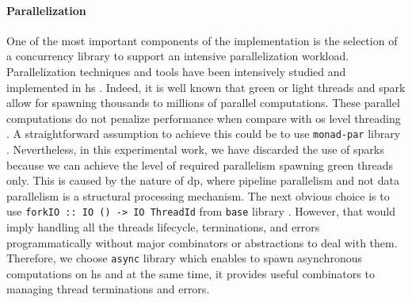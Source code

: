 \documentclass[preprint]{elsarticle}
\begin{document}
\paragraph{Parallelization} One of the most important components of the implementation is the selection of a concurrency library to support an intensive parallelization workload. Parallelization techniques and tools have been intensively studied and implemented in \acrshort{hs} \cite{monadpar}. Indeed, it is well known that green or light threads and spark allow for spawning thousands to millions of parallel computations. These parallel computations do not penalize performance when compare with \acrfull{os} level threading \cite{parallelbook}. 
A straightforward assumption to achieve this could be to use \texttt{monad-par} library \cite{monadparlib, monadpar}. Nevertheless, in this experimental work, we have discarded the use of sparks \cite{sparks} because we can achieve the level of required parallelism spawning green threads only. This is caused by the nature of \acrshort{dp}, where pipeline parallelism and not data parallelism is a structural processing mechanism. The next obvious choice is to use \texttt{forkIO :: IO () -> IO ThreadId} from \texttt{base} library \cite{forkio}. However, that would imply handling all the threads lifecycle, terminations, and errors programmatically without major combinators or abstractions to deal with them. Therefore, we choose \texttt{async} library \cite{async}  which enables to spawn asynchronous computations \cite{parallelbook} on \acrshort{hs} and at the same time, it provides useful combinators to managing thread terminations and errors.
\end{document}
